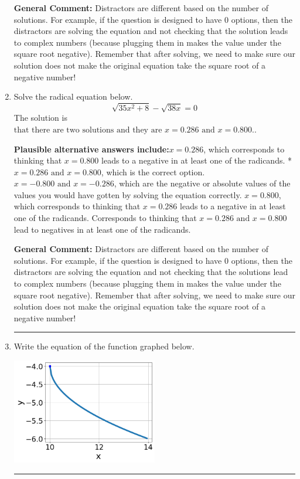\documentclass{extbook}[14pt]
\newcommand{\litem}[1]{\item #1

\rule{\textwidth}{0.4pt}}
\begin{document}
\begin{enumerate}
{\textbf{General Comment:} Distractors are different based on the number of solutions. For example, if the question is designed to have 0 options, then the distractors are solving the equation and not checking that the solution leads to complex numbers (because plugging them in makes the value under the square root negative). Remember that after solving, we need to make sure our solution does not make the original equation take the square root of a negative number!
}
\litem{
Solve the radical equation below.
\[ \sqrt{35 x^2 + 8} - \sqrt{38 x} = 0 \]The solution is \( \text{that there are two solutions and they are } x = 0.286 \text{ and } x = 0.800. \).\begin{enumerate}[label=\Alph*.]
\textbf{Plausible alternative answers include:}$x = 0.286$, which corresponds to thinking that $x = 0.800$ leads to a negative in at least one of the radicands.
* $x = 0.286 \text{ and } x = 0.800$, which is the correct option.
$x = -0.800 \text{ and } x = -0.286$, which are the negative or absolute values of the values you would have gotten by solving the equation correctly.
$x = 0.800$, which corresponds to thinking that $x = 0.286$ leads to a negative in at least one of the radicands.
Corresponds to thinking that $x = 0.286 \text{ and } x = 0.800$ lead to negatives in at least one of the radicands.
\end{enumerate}

\textbf{General Comment:} Distractors are different based on the number of solutions. For example, if the question is designed to have 0 options, then the distractors are solving the equation and not checking that the solutions lead to complex numbers (because plugging them in makes the value under the square root negative). Remember that after solving, we need to make sure our solution does not make the original equation take the square root of a negative number!
}
\litem{
Write the equation of the function graphed below.

\begin{center}
    \includegraphics[width=0.5\textwidth]{../Figures/radicalGraphToEquationCopyA.png}
\end{center}


}
\end{enumerate}
\end{document}
